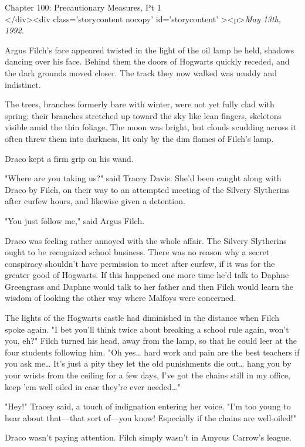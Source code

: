 
Chapter 100: Precautionary Measures, Pt 1\\
</div><div  class='storycontent nocopy' id='storycontent' ><p>\emph{May 13th, 
1992.}

Argus Filch's face appeared twisted in the light of the oil lamp he held, 
shadows dancing over his face. Behind them the doors of Hogwarts quickly 
receded, and the dark grounds moved closer. The track they now walked was muddy 
and indistinct.

The trees, branches formerly bare with winter, were not yet fully clad with 
spring; their branches stretched up toward the sky like lean fingers, skeletons 
visible amid the thin foliage. The moon was bright, but clouds scudding across 
it often threw them into darkness, lit only by the dim flames of Filch's lamp.

Draco kept a firm grip on his wand.

"Where are you taking us?" said Tracey Davis. She'd been caught along with 
Draco by Filch, on their way to an attempted meeting of the Silvery Slytherins 
after curfew hours, and likewise given a detention.

"You just follow me," said Argus Filch.

Draco was feeling rather annoyed with the whole affair. The Silvery Slytherins 
ought to be recognized school business. There was no reason why a secret 
conspiracy shouldn't have permission to meet after curfew, if it was for the 
greater good of Hogwarts. If this happened one more time he'd talk to Daphne 
Greengrass and Daphne would talk to her father and then Filch would learn the 
wisdom of looking the other way where Malfoys were concerned.

The lights of the Hogwarts castle had diminished in the distance when Filch 
spoke again. "I bet you'll think twice about breaking a school rule again, 
won't you, eh?" Filch turned his head, away from the lamp, so that he could 
leer at the four students following him. "Oh yes{\ldots} hard work and pain are 
the best teachers if you ask me{\ldots} It's just a pity they let the old 
punishments die out{\ldots} hang you by your wrists from the ceiling for a few 
days, I've got the chains still in my office, keep 'em well oiled in case 
they're ever needed{\ldots}"

"Hey!" Tracey said, a touch of indignation entering her voice. "I'm too young 
to hear about that---that sort of---you know! Especially if the chains are 
well-oiled!"

Draco wasn't paying attention. Filch simply wasn't in Amycus Carrow's league.

